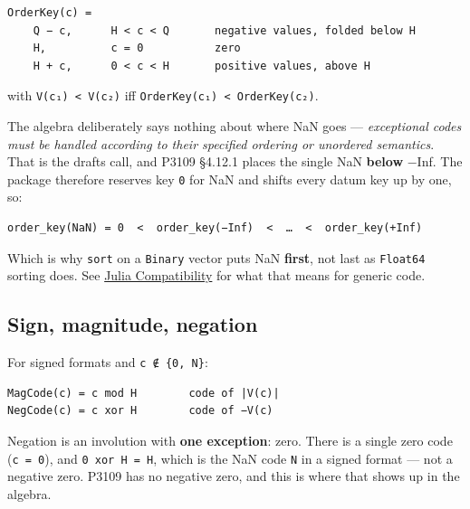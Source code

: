 \nopagebreak[4]
\begin{verbatim}
OrderKey(c) =
    Q − c,      H < c < Q       negative values, folded below H
    H,          c = 0           zero
    H + c,      0 < c < H       positive values, above H
\end{verbatim}



with \texttt{V(c₁) < V(c₂)} iff \texttt{OrderKey(\allowbreak{}c₁) < OrderKey(\allowbreak{}c₂)}.



The algebra deliberately says nothing about where NaN goes — \emph{{\textquotedbl}exceptional codes must be handled according to their specified ordering or unordered semantics{\textquotedbl}}. That is the draft{\textquotesingle}s call, and P3109 §4.12.1 places the single NaN \textbf{below} −Inf. The package therefore reserves key \texttt{0} for NaN and shifts every datum key up by one, so:




\nopagebreak[4]
\begin{verbatim}
order_key(NaN) = 0  <  order_key(−Inf)  <  …  <  order_key(+Inf)
\end{verbatim}



Which is why \texttt{sort} on a \texttt{Binary} vector puts NaN \textbf{first}, not last as \texttt{Float64} sorting does. See \href{reference\_\allowbreak{}julia\_\allowbreak{}compat.md}{Julia Compatibility} for what that means for generic code.



\subsection{Sign, magnitude, negation}



\label{2367407655063868506}{}


For signed formats and \texttt{c ∉ \{0, N\}}:




\nopagebreak[4]
\begin{verbatim}
MagCode(c) = c mod H        code of |V(c)|
NegCode(c) = c xor H        code of −V(c)
\end{verbatim}



Negation is an involution with \textbf{one exception}: zero. There is a single zero code (\texttt{c = 0}), and \texttt{0 xor H = H}, which is the NaN code \texttt{N} in a signed format — not a negative zero. P3109 has no negative zero, and this is where that shows up in the algebra.



